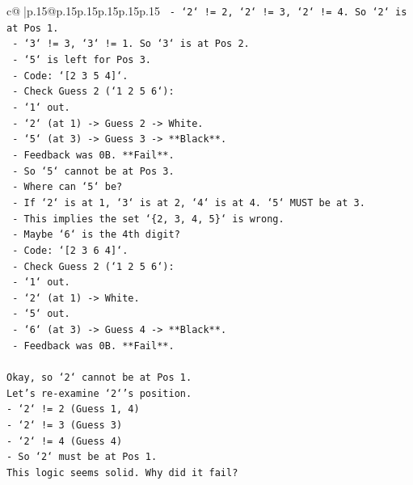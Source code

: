 \documentclass{article}
\begin{document}
{\begin{supertabular}{c@{$\;$}|p{.15\linewidth}@{}p{.15\linewidth}p{.15\linewidth}p{.15\linewidth}p{.15\linewidth}p{.15\linewidth}}
{{{\texttt{        {-} `2` != 2, `2` != 3, `2` != 4. So `2` is at Pos 1.} \\
\texttt{        {-} `3` != 3, `3` != 1. So `3` is at Pos 2.} \\
\texttt{        {-} `5` is left for Pos 3.} \\
\texttt{        {-} Code: `{[}2 3 5 4{]}`.} \\
\texttt{        {-} Check Guess 2 (`1 2 5 6`):} \\
\texttt{            {-} `1` out.} \\
\texttt{            {-} `2` (at 1) {-}> Guess 2 {-}> White.} \\
\texttt{            {-} `5` (at 3) {-}> Guess 3 {-}> **Black**.} \\
\texttt{            {-} Feedback was 0B. **Fail**.} \\
\texttt{    {-} So `5` cannot be at Pos 3.} \\
\texttt{    {-} Where can `5` be?} \\
\texttt{        {-} If `2` is at 1, `3` is at 2, `4` is at 4. `5` MUST be at 3.} \\
\texttt{        {-} This implies the set `\{2, 3, 4, 5\}` is wrong.} \\
\texttt{    {-} Maybe `6` is the 4th digit?} \\
\texttt{        {-} Code: `{[}2 3 6 4{]}`.} \\
\texttt{        {-} Check Guess 2 (`1 2 5 6`):} \\
\texttt{            {-} `1` out.} \\
\texttt{            {-} `2` (at 1) {-}> White.} \\
\texttt{            {-} `5` out.} \\
\texttt{            {-} `6` (at 3) {-}> Guess 4 {-}> **Black**.} \\
\texttt{            {-} Feedback was 0B. **Fail**.} \\
\\ 
\texttt{Okay, so `2` cannot be at Pos 1.} \\
\texttt{Let's re{-}examine `2`'s position.} \\
\texttt{{-} `2` != 2 (Guess 1, 4)} \\
\texttt{{-} `2` != 3 (Guess 3)} \\
\texttt{{-} `2` != 4 (Guess 4)} \\
\texttt{{-} So `2` must be at Pos 1.} \\
\texttt{This logic seems solid. Why did it fail?} \\
}}}
\end{supertabular}}
\end{document}
